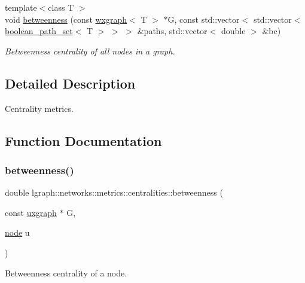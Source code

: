 \begin{DoxyCompactItemize}
{\footnotesize template$<$class T $>$ }\\void \hyperlink{namespacelgraph_1_1networks_1_1metrics_1_1centralities_aef9634512e57101c088177e0875ed937}{betweenness} (const \hyperlink{classlgraph_1_1wxgraph}{wxgraph}$<$ T $>$ $\ast$G, const std\+::vector$<$ std\+::vector$<$ \hyperlink{namespacelgraph_afad432931ba600ab1628d5c9595986c5}{boolean\+\_\+path\+\_\+set}$<$ T $>$ $>$ $>$ \&paths, std\+::vector$<$ double $>$ \&bc)
\begin{DoxyCompactList}\small\item\em Betweenness centrality of all nodes in a graph. \end{DoxyCompactList}\end{DoxyCompactItemize}


\subsection{Detailed Description}
Centrality metrics. 

\subsection{Function Documentation}
\mbox{\label{namespacelgraph_1_1networks_1_1metrics_1_1centralities_a0834cb72864b1bdf574c212c5cafbce9}} 
\subsubsection{\texorpdfstring{betweenness()}{betweenness()}\hspace{0.1cm}{\footnotesize\ttfamily [1/8]}}
{\footnotesize\ttfamily double lgraph\+::networks\+::metrics\+::centralities\+::betweenness (\begin{DoxyParamCaption}\item[{const \hyperlink{classlgraph_1_1uxgraph}{uxgraph} $\ast$}]{G,  }\item[{\hyperlink{namespacelgraph_a397169dd66adf725210a30fb7251773e}{node}}]{u }\end{DoxyParamCaption})}



Betweenness centrality of a node. 


